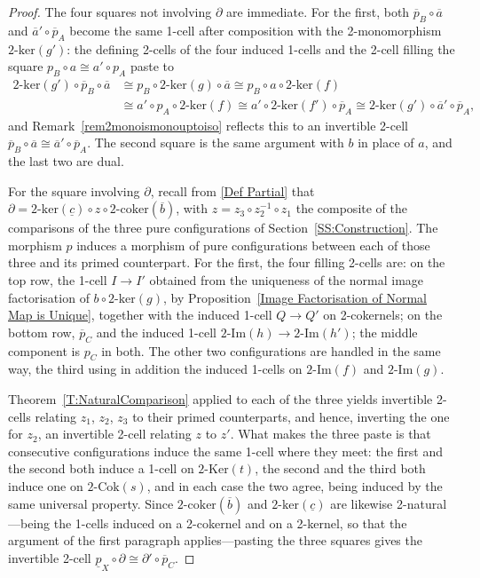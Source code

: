 \documentclass[reqno,a4paper]{amsart}
\numberwithin{equation}{section}
\theoremstyle{plain}
\theoremstyle{definition}
\def\nameit#1{\textrm{#1}~}
\def\thex{\nameit{Theorem}}
\def\prox{\nameit{Proposition}}
\def\remx{\nameit{Remark}}
\newcommand{\comp}{\circ}
\newcommand{\iso}{\cong}
\newcommand{\ov}[1]{\overline{#1}}
\renewcommand{\1}{\onecat{1}}
\newcommand{\TwoKer}{\ensuremath{2\text{-}\mathrm{Ker}}}
\newcommand{\TwoCoker}{\ensuremath{2\text{-}\mathrm{Cok}}}
\newcommand{\twoker}{\ensuremath{2\text{-}\mathrm{ker}}}
\newcommand{\twocoker}{\ensuremath{2\text{-}\mathrm{coker}}}
\newcommand{\TwoImg}{\ensuremath{2\text{-}\mathrm{Im}}}
\begin{document}
\begin{proof}
	The four squares not involving \(\partial\) are immediate. For the first, both \(\ov{p}_B\comp\ov{a}\) and \(\ov{a}'\comp\ov{p}_A\) become the same 1-cell after composition with the 2-monomorphism \(\twoker(g')\): the defining 2-cells of the four induced 1-cells and the 2-cell filling the square \(p_B\comp a\iso a'\comp p_A\) paste to
	\begin{align*}
		\twoker(g')\comp\ov{p}_B\comp\ov{a}
		 & \iso p_B\comp\twoker(g)\comp\ov{a}
		\iso p_B\comp a\comp\twoker(f)        \\
		 & \iso a'\comp p_A\comp\twoker(f)
		\iso a'\comp\twoker(f')\comp\ov{p}_A
		\iso\twoker(g')\comp\ov{a}'\comp\ov{p}_A\text{,}
	\end{align*}
	and \remx\ref{rem2monoismonouptoiso} reflects this to an invertible 2-cell \(\ov{p}_B\comp\ov{a}\iso\ov{a}'\comp\ov{p}_A\). The second square is the same argument with \(b\) in place of \(a\), and the last two are dual.

	For the square involving \(\partial\), recall from \eqref{Def Partial} that \(\partial=\twoker(\underline{c})\comp z\comp\twocoker(\ov{b})\), with \(z=z_3\comp z_2^{-1}\comp z_1\) the composite of the comparisons of the three pure configurations of Section~\ref{SS:Construction}. The morphism \(p\) induces a morphism of pure configurations between each of those three and its primed counterpart. For the first, the four filling 2-cells are: on the top row, the 1-cell \(I\to I'\) obtained from the uniqueness of the normal image factorisation of \(b\comp\twoker(g)\), by \prox\ref{Image Factorisation of Normal Map is Unique}, together with the induced 1-cell \(Q\to Q'\) on 2-cokernels; on the bottom row, \(\ov{p}_C\) and the induced 1-cell \(\TwoImg(h)\to\TwoImg(h')\); the middle component is \(p_C\) in both. The other two configurations are handled in the same way, the third using in addition the induced 1-cells on \(\TwoImg(f)\) and \(\TwoImg(g)\).

	\thex\ref{T:NaturalComparison} applied to each of the three yields invertible 2-cells relating \(z_1\), \(z_2\), \(z_3\) to their primed counterparts, and hence, inverting the one for \(z_2\), an invertible 2-cell relating \(z\) to \(z'\). What makes the three paste is that consecutive configurations induce the same 1-cell where they meet: the first and the second both induce a 1-cell on \(\TwoKer(t)\), the second and the third both induce one on \(\TwoCoker(s)\), and in each case the two agree, being induced by the same universal property. Since \(\twocoker(\ov{b})\) and \(\twoker(\underline{c})\) are likewise 2-natural---being the 1-cells induced on a 2-cokernel and on a 2-kernel, so that the argument of the first paragraph applies---pasting the three squares gives the invertible 2-cell \(\underline{p}_X\comp\partial\iso\partial'\comp\ov{p}_C\).
\end{proof}
\end{document}
